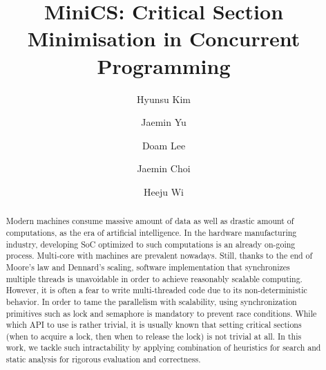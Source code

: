 \documentclass[sigconf]{acmart}
\begin{document}
\title{MiniCS: Critical Section Minimisation in Concurrent Programming}
\author{Hyunsu Kim}

\author{Jaemin Yu}

\author{Doam Lee}

\author{Jaemin Choi}

\author{Heeju Wi}

\begin{abstract}
Modern machines consume massive amount of data as well as drastic amount of computations, as the era of artificial intelligence. In the hardware manufacturing industry, developing SoC optimized to such computations is an already on-going process. Multi-core with machines are prevalent nowadays. Still, thanks to the end of Moore's law and Dennard's scaling, software implementation that synchronizes multiple threads is unavoidable in order to achieve reasonably scalable computing. However, it is often a fear to write multi-threaded code due to its non-deterministic behavior. In order to tame the parallelism with scalability, using synchronization primitives such as lock and semaphore is mandatory to prevent race conditions. While which API to use is rather trivial, it is usually known that setting critical sections (when to acquire a lock, then when to release the lock) is not trivial at all. In this work, we tackle such intractability by applying combination of heuristics for search and static analysis for rigorous evaluation and correctness.
\end{abstract}

\maketitle
\end{document}
